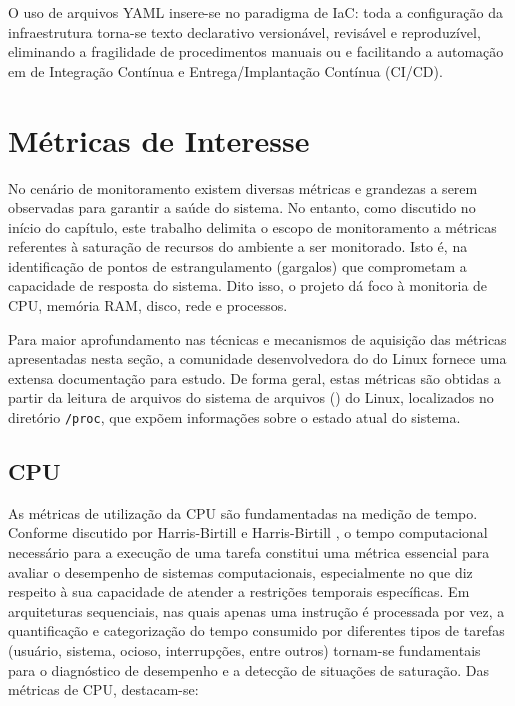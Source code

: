 O uso de arquivos YAML insere-se no paradigma de IaC: toda a configuração da infraestrutura torna-se texto declarativo versionável, revisável e reproduzível, eliminando a fragilidade de procedimentos manuais ou  e facilitando a automação em  de Integração Contínua e Entrega/Implantação Contínua (CI/CD).


\section{Métricas de Interesse}
\label{section:Metricas}

No cenário de monitoramento existem diversas métricas e grandezas a serem observadas para garantir a saúde do sistema. No entanto, como discutido no início do capítulo, este trabalho delimita o escopo de monitoramento a métricas referentes à saturação de recursos do ambiente a ser monitorado. Isto é, na identificação de pontos de estrangulamento (gargalos) que comprometam a capacidade de resposta do sistema. Dito isso, o projeto dá foco à monitoria de CPU, memória RAM, disco, rede e processos.

Para maior aprofundamento nas técnicas e mecanismos de aquisição das métricas apresentadas nesta seção, a comunidade desenvolvedora do  do Linux fornece uma extensa documentação \citep{linuxkernel2025} para estudo. {De forma geral, estas métricas são obtidas a partir da leitura de arquivos do sistema de arquivos () do Linux, localizados no diretório \verb|/proc|, que expõem informações sobre o estado atual do sistema.}

\subsection{CPU}
\label{subsection:CPU}

As métricas de utilização da CPU \citep{cpumetrics2025} são fundamentadas na medição de tempo. Conforme discutido por Harris-Birtill e Harris-Birtill \citep{harris-birtill2021}, o tempo computacional necessário para a execução de uma tarefa constitui uma métrica essencial para avaliar o desempenho de sistemas computacionais, especialmente no que diz respeito à sua capacidade de atender a restrições temporais específicas. Em arquiteturas sequenciais, nas quais apenas uma instrução é processada por vez, a quantificação e categorização do tempo consumido por diferentes tipos de tarefas (usuário, sistema, ocioso, interrupções, entre outros) tornam-se fundamentais para o diagnóstico de desempenho e a detecção de situações de saturação. Das métricas de CPU, destacam-se:

